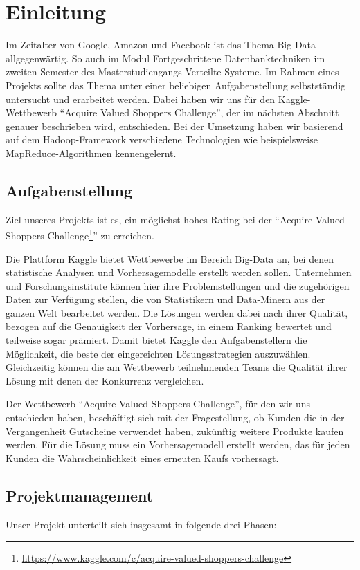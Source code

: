 \section{Einleitung}
Im Zeitalter von Google, Amazon und Facebook ist das Thema Big-Data allgegenwärtig. So auch im Modul Fortgeschrittene Datenbanktechniken im zweiten Semester des Masterstudiengangs Verteilte Systeme. Im Rahmen eines Projekts sollte das Thema unter einer beliebigen Aufgabenstellung selbstständig untersucht und erarbeitet werden. Dabei haben wir uns für den Kaggle-Wettbewerb "`Acquire Valued Shoppers Challenge"', der im nächsten Abschnitt genauer beschrieben wird, entschieden. Bei der Umsetzung haben wir basierend auf dem Hadoop-Framework verschiedene Technologien wie beispielsweise MapReduce-Algorithmen kennengelernt.

\subsection{Aufgabenstellung}
Ziel unseres Projekts ist es, ein möglichst hohes Rating bei der "`Acquire Valued Shoppers Challenge\footnote{\url{https://www.kaggle.com/c/acquire-valued-shoppers-challenge}}"' zu erreichen.

Die Plattform Kaggle bietet Wettbewerbe im Bereich Big-Data an, bei denen statistische Analysen und Vorhersagemodelle erstellt werden sollen. Unternehmen und Forschungsinstitute können hier ihre Problemstellungen und die zugehörigen Daten zur Verfügung stellen, die von Statistikern und Data-Minern aus der ganzen Welt bearbeitet werden. Die Lösungen werden dabei nach ihrer Qualität, bezogen auf die Genauigkeit der Vorhersage, in einem Ranking bewertet und teilweise sogar prämiert. Damit bietet Kaggle den Aufgabenstellern die Möglichkeit, die beste der eingereichten Lösungsstrategien auszuwählen. Gleichzeitig können die am Wettbewerb teilnehmenden Teams die Qualität ihrer Lösung mit denen der Konkurrenz vergleichen.

Der Wettbewerb "`Acquire Valued Shoppers Challenge"', für den wir uns entschieden haben, beschäftigt sich mit der Fragestellung, ob Kunden die in der Vergangenheit Gutscheine verwendet haben, zukünftig weitere Produkte kaufen werden. Für die Lösung muss ein Vorhersagemodell erstellt werden, das für jeden Kunden die Wahrscheinlichkeit eines erneuten Kaufs vorhersagt. 

\newpage
\subsection{Projektmanagement}
Unser Projekt unterteilt sich insgesamt in folgende drei Phasen:

